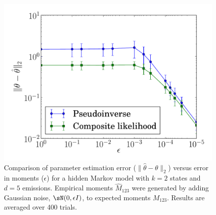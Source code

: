 \begin{figure}
  \centering
  \includegraphics[width=0.8\columnwidth]{figures/asymp-k2d5.pdf}
  \caption{
  Comparison of parameter estimation error ($\|\hat \theta
    - \theta\|_2$) versus error in moments ($\epsilon$) for a hidden
    Markov model with $k=2$ states and $d=5$ emissions.
  Empirical moments $\widehat M_{123}$ were generated by adding Gaussian
    noise, $\sN(0,\epsilon I)$, to expected moments $M_{123}$.
  Results are averaged over 400 trials.}
    \label{fig:cl-hmm}
\end{figure}
